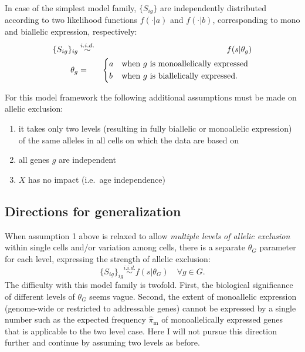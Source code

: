 \documentclass[letterpaper]{article}
\begin{document}
In case of the simplest model family, $\{S_{ig}\}$ are independently
distributed according to two likelihood functions $f(\cdot|a)$ and
$f(\cdot|b)$, corresponding to mono and biallelic expression, respectively:
\begin{eqnarray}
\label{eq:two-level}
\{S_{ig}\}_{ig} &\overset{i.i.d.}{\sim}& f(s | \theta_g) \\
\label{eq:two-level-cases}
\theta_g &=&
\begin{dcases*}
a & when $g$ is monoallelically expressed \\
b & when $g$ is biallelically expressed.
\end{dcases*}
\end{eqnarray}

For this model framework the following additional assumptions must be made on
allelic exclusion:
\begin{enumerate}
\item it takes only two levels (resulting in fully biallelic or monoallelic
expression) of the same alleles in all cells on which the data are based on
\item all genes $g$ are independent
\item $X$ has no impact (i.e.~age independence)
\end{enumerate}

\subsection{Directions for generalization}
\label{sec:generalizations}

When assumption 1 above is relaxed to allow \emph{multiple levels of allelic exclusion}
within single cells and/or variation among cells, there is a separate
$\theta_G$ parameter for each level, expressing the strength of allelic
exclusion:
\begin{equation*}
\{S_{ig}\}_{ig} \overset{i.i.d.}{\sim} f(s | \theta_G) \quad \forall g \in G.
\end{equation*}
The difficulty with this model family is twofold.  First, the biological
significance of different levels of $\theta_G$ seems vague.  Second, the
extent of monoallelic expression (genome-wide or restricted to addressable
genes) cannot be expressed by a single number such as the expected
frequency $\hat{\pi}_\mathrm{m}$ of monoallelically expressed genes that is applicable
to the two level case.  Here I will not pursue this direction further and
continue by assuming two levels as before.
\end{document}
